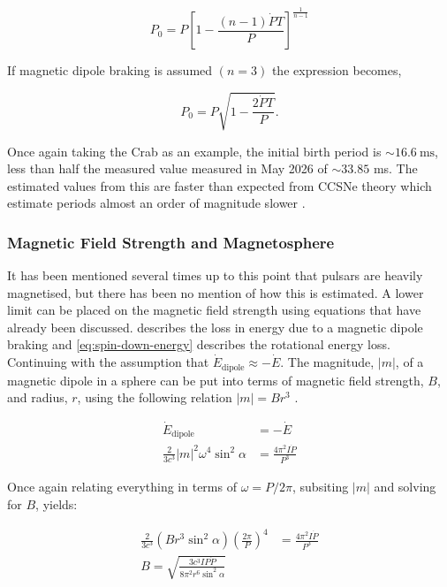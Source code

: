 \begin{equation}
    P_0 = P\left[ 1 - \frac{(n-1) \dot P T}{P} \right]^\frac{1}{n-1}
\end{equation}

If magnetic dipole braking is assumed $(n=3)$ the expression becomes, 

\begin{equation}
    P_0 = P \sqrt{1 - \frac{2 \dot P T}{P}}.
\end{equation}

Once again taking the Crab as an example, the initial birth period is $\sim 16.6~\text{ms}$, less than half the measured value measured in May 2026 of $\sim 33.85$ ms. The estimated values from this are faster than expected from CCSNe theory which estimate periods almost an order of magnitude slower \citep{heger_how_2003}.   

\subsubsection{Magnetic Field Strength and Magnetosphere}

It has been mentioned several times up to this point that pulsars are heavily magnetised, but there has been no mention of how this is estimated. A lower limit can be placed on the magnetic field strength using equations that have already been discussed.   describes the loss in energy due to a magnetic dipole braking and \cref{eq:spin-down-energy} describes the rotational energy loss. Continuing with the assumption that $\dot E_{\text{dipole}} \approx -\dot E$. The magnitude, $|m|$, of a magnetic dipole in a sphere can be put into terms of magnetic field strength, $B$, and radius, $r$, using the following relation $|m| = Br^3$ \citep{griffiths2017electrodynamics}. 

\begin{align}
    \dot E_{\text{dipole}} & = -\dot E \\ 
    \frac{2}{3c^3} |m|^2 \omega^4 \sin^2 \alpha & = \frac{4\pi^2 I \dot P}{P^3} 
\end{align}

Once again relating everything in terms of $\omega = P/2\pi$, subsiting $|m|$ and solving for $B$, yields: 

\begin{align}
    \frac{2}{3c^3} (Br^3  \sin^2 \alpha) \left( \frac{2 \pi}{P} \right)^4 & = \frac{4\pi^2 I \dot P}{P^3} \\
    B = \sqrt{\frac{3c^3 I P\dot P}{8 \pi^2 r^6 \sin^2 \alpha}}
    \label{eq:magneticfieldstrength}
\end{align}

